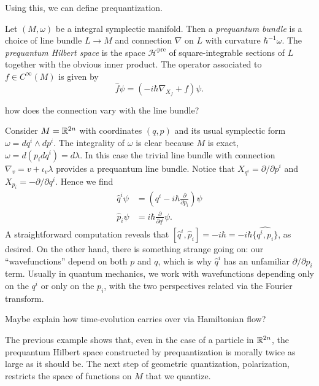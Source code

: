\documentclass{amsart}
\begin{document}
Using this, we can define prequantization.
\begin{definition}
    Let $(M,\omega)$ be a integral symplectic manifold. Then a \textit{prequantum bundle} is
    a choice of line bundle $L\to M$ and connection $\nabla$ on $L$ with curvature $\hbar^{-1}\omega$.
    The \textit{prequantum Hilbert space} is the space $\mathcal{H}^\text{pre}$ of square-integrable
    sections of $L$ together with the obvious inner product. The operator associated to $f\in C^\infty(M)$
    is given by
    \begin{equation*}
        \hat f\psi = (-i\hbar\nabla_{X_f} + f)\psi.
    \end{equation*}
\end{definition}

{\color{red} how does the connection vary with the line bundle?}

\begin{example}
    Consider $M=\mathbb{R}^{2n}$ with coordinates $(q,p)$ and its usual symplectic form $\omega=dq^i\wedge dp^i$.
    The integrality of $\omega$ is clear because $M$ is exact, $\omega=d(p_idq^i)=d\lambda$. In this case
    the trivial line bundle with connection $\nabla_{v}=v+\iota_{v}\lambda$ provides a prequantum
    line bundle. Notice that $X_{q^i}=\partial/\partial p^i$ and $X_{p_i}=-\partial/\partial q^i$.
    Hence we find
    \begin{align*}
        \hat q^i\psi &= \left(q^i -i\hbar \frac{\partial}{\partial p_i}\right)\psi\\
        \hat p_i\psi &= i\hbar\frac{\partial}{\partial q^i}\psi.
    \end{align*}
    A straightforward computation reveals that $[\hat q^i,\hat p_i]=-i\hbar=-i\hbar\widehat{\{q^i,p_i\}}$,
    as desired. On the other hand, there is something strange going on: our ``wavefunctions'' depend
    on both $p$ and $q$, which is why $\hat q^i$ has an unfamiliar $\partial/\partial p_i$ term. 
    Usually in quantum mechanics, we work with wavefunctions depending only on the $q^i$ or only on
    the $p_i$, with the two perspectives related via the Fourier transform.
\end{example}
{\color{red} Maybe explain how time-evolution carries over via Hamiltonian flow?}

The previous example shows that, even in the case of a particle in $\mathbb{R}^{2n}$, the prequantum
Hilbert space constructed by prequantization is morally twice as large as it should be.
The next step of geometric quantization, polarization, restricts the space of functions on $M$
that we quantize.
\end{document}
